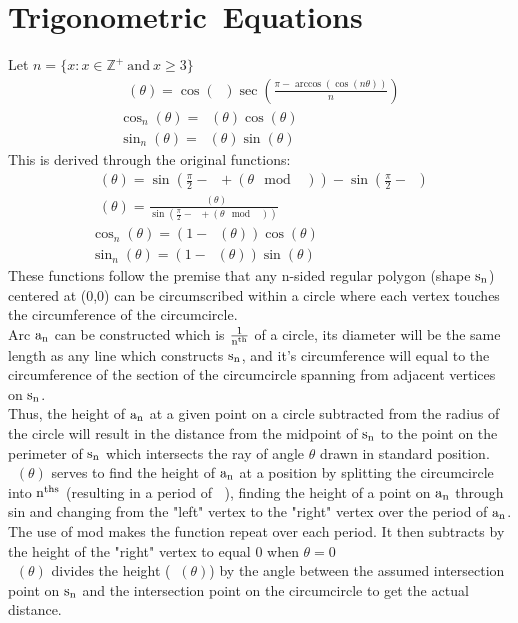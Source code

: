 \documentclass[11pt]{article}
\DeclareMathOperator{\custd}{\mathrm{d}_n}
\DeclareMathOperator{\custh}{\mathrm{h}_n}
\DeclareMathOperator{\period}{\frac{2\pi}{n}}
\DeclareMathOperator{\hp}{\frac{\pi}{n}}
\begin{document}
\section{Trigonometric\  Equations}
Let \(n=\{x:x\in\mathbb{Z}^+\ \mathrm{and}\ x\geq3\}\)
\begin{gather*}
   		\custd(\theta)=\cos(\hp)\sec(\frac{\pi - \arccos(\cos(n\theta))}{n})\\
   		\cos_n(\theta)=\custd(\theta)\cos(\theta)\\
   		\sin_n(\theta)=\custd(\theta)\sin(\theta)
\end{gather*}
This is derived through the original functions:
\begin{gather*}
   		\custh(\theta)=\sin(\frac{\pi}{2}-\hp+(\theta\mod\period))-\sin(\frac{\pi}{2}-\hp)\\
   		\custd(\theta)=\frac{\custh(\theta)}{\sin(\frac{\pi}{2}-\hp+(\theta\mod\period))}\\
   		\cos_n(\theta)=(1-\custd(\theta))\cos(\theta)\\
   		\sin_n(\theta)=(1-\custd(\theta))\sin(\theta)
\end{gather*}
These functions follow the premise that any n-sided regular polygon (shape \(\rm s_n\)) centered at (0,0) can be circumscribed within a circle where each vertex touches the circumference of the circumcircle. \\
Arc \(\rm a_n\) can be constructed which is \(\rm \frac{1}{n^{th}}\) of a circle, its diameter will be the same length as any line which constructs \(\rm s_n\), and it's circumference will equal to the circumference of the section of the circumcircle spanning from adjacent vertices on \(\rm s_n\). \\
Thus, the height of \(\rm a_n\) at a given point on a circle subtracted from the radius of the circle will result in the distance from the midpoint of \(\rm s_n\) to the point on the perimeter of \(\rm s_n\) which intersects the ray of angle \(\theta\) drawn in standard position.\\
\(\custh(\theta)\) serves to find the height of \(\rm a_n\) at a position by splitting the circumcircle into \(\rm n^{ths}\) (resulting in a period of \(\period\)), finding the height of a point on \(\rm a_n\) through sin and changing from the "left" vertex to the "right" vertex over the period of \(\rm a_n\). The use of mod makes the function repeat over each period. It then subtracts by the height of the "right" vertex to equal 0 when \(\theta=0\)\\
\(\custd(\theta)\) divides the height (\(\custh(\theta)\)) by the angle between the assumed intersection point on \(\rm s_n\) and the intersection point on the circumcircle to get the actual distance.\\
\end{document}
